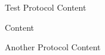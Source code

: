 \documentclass{article}
\begin{document}
\begin{lsprotocol}{Test Protocol}
Content
\end{lsprotocol}
\begin{stpprotocol}
Content
\end{stpprotocol}
\begin{heprotocol}{Another Protocol}
Content
\end{heprotocol}
\end{document}
